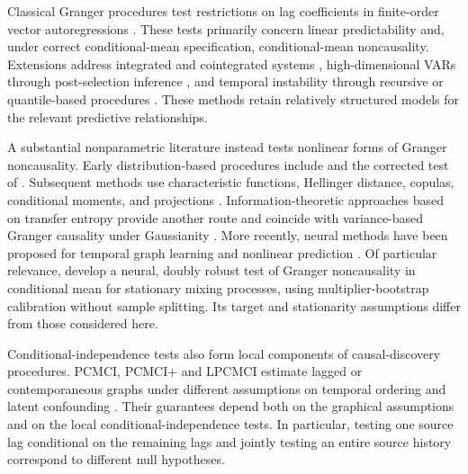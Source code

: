 \documentclass[12pt]{article}
\numberwithin{equation}{section}
\begin{document}
Classical Granger procedures test restrictions on lag coefficients in finite-order vector autoregressions \citep{lutkepohl2005new}. These tests primarily concern linear predictability and, under correct conditional-mean specification, conditional-mean noncausality. Extensions address integrated and cointegrated systems \citep{toda1995statistical}, high-dimensional VARs through post-selection inference \citep{hecq2023granger}, and temporal instability through recursive or quantile-based procedures \citep{shi2018change,mayer2024quantile}. These methods retain relatively structured models for the relevant predictive relationships.

A substantial nonparametric literature instead tests nonlinear forms of Granger noncausality. Early distribution-based procedures include \citet{hiemstra1994testing} and the corrected test of \citet{diks2006new}. Subsequent methods use characteristic functions, Hellinger distance, copulas, conditional moments, and projections \citep{su2007consistent,su2008hellinger,bouezmarni2012copula,
nishiyama2011consistent,zhou2022projective,song2021nonparametric}. Information-theoretic approaches based on transfer entropy provide another route and coincide with variance-based Granger causality under Gaussianity \citep{schreiber2000measuring,barnett2009granger}. More recently, neural methods have been proposed for temporal graph learning and nonlinear prediction \citep{tank2022neural,nauta2019causal,cheng2023neural}. Of particular relevance, \citet{hui2025deep} develop a neural, doubly robust test of Granger noncausality in conditional mean for stationary mixing processes, using multiplier-bootstrap calibration without sample splitting. Its target and stationarity assumptions differ from those considered here.

Conditional-independence tests also form local components of causal-discovery procedures. PCMCI, PCMCI+ and LPCMCI estimate lagged or contemporaneous graphs under different assumptions on temporal ordering and latent confounding \citep{runge2019detecting,runge2020discovering,gerhardus2020high}. Their guarantees depend both on the graphical assumptions and on the local conditional-independence tests. In particular, testing one source lag conditional on the remaining lags and jointly testing an entire source history correspond to different null hypotheses.
\end{document}
